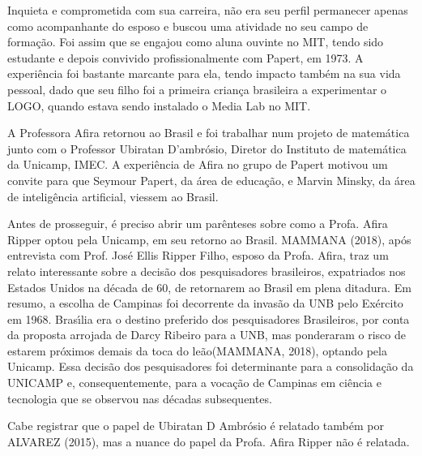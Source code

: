 \documentclass[
12pt,		%
openright,	%
twoside,  %
a4paper,			%
chapter=TITLE,		%
english,			%
french,				%
spanish,			%
brazil				%
]{USPSC-classe/USPSC}
\begin{document}
Inquieta e comprometida com sua carreira, n\~ao era seu perfil permanecer apenas como acompanhante do esposo e buscou uma atividade no seu campo de forma\c{c}\~ao. Foi assim que se engajou como aluna ouvinte no MIT, tendo sido estudante e depois convivido profissionalmente com Papert, em 1973. A experi\^encia foi bastante marcante para ela, tendo impacto tamb\'em na sua vida pessoal, dado que seu filho foi a primeira crian\c{c}a brasileira a experimentar o LOGO, quando estava sendo instalado o Media Lab no MIT.









A Professora Afira retornou ao Brasil e foi trabalhar num projeto de matem\'atica junto com o Professor Ubiratan D’ambr\'osio, Diretor do Instituto de matem\'atica da Unicamp, IMEC. A experi\^encia de Afira no grupo de Papert motivou um convite para que Seymour Papert, da \'area de educa\c{c}\~ao, e Marvin Minsky, da \'area de intelig\^encia artificial, viessem ao Brasil.









Antes de prosseguir, \'e preciso abrir um par\^enteses sobre como a Profa. Afira Ripper optou pela Unicamp, em seu retorno ao Brasil.  MAMMANA (2018), ap\'os entrevista com Prof. Jos\'e Ellis Ripper Filho, esposo da Profa. Afira, traz um relato interessante sobre a decis\~ao dos pesquisadores brasileiros, expatriados nos Estados Unidos na d\'ecada de 60, de retornarem ao Brasil em plena ditadura. Em resumo, a escolha de Campinas foi decorrente da invas\~ao da UNB pelo Ex\'ercito em 1968. Bras\'{\i}lia era o destino preferido dos pesquisadores Brasileiros, por conta da proposta arrojada de Darcy Ribeiro para a UNB, mas ponderaram o risco de estarem pr\'oximos demais da \textquotedbl toca do le\~ao\textquotedbl   (MAMMANA, 2018), optando pela Unicamp. Essa decis\~ao dos pesquisadores foi determinante para a consolida\c{c}\~ao da UNICAMP e, consequentemente, para a voca\c{c}\~ao de Campinas em ci\^encia e tecnologia que se observou nas d\'ecadas subsequentes.









Cabe registrar que o papel de Ubiratan D Ambr\'osio \'e relatado tamb\'em por ALVAREZ (2015), mas a nuance do papel da Profa. Afira Ripper n\~ao \'e relatada.
\end{document}
